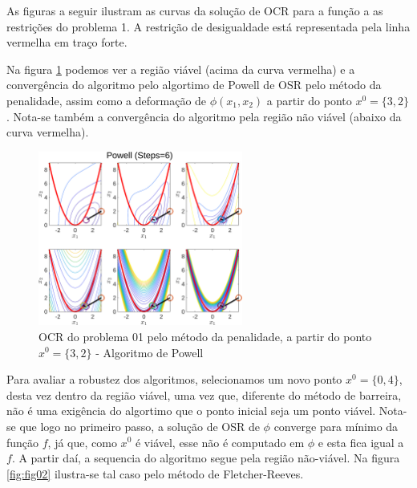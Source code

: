 \documentclass[10pt, a4paper]{article}
\begin{document}

\newpage

As figuras a seguir ilustram as curvas da solu\c c\~ao de OCR para a fun\c c\~ao a as restri\c c\~oes do problema 1. A restri\c c\~ao de desigualdade est\'a representada pela linha vermelha em tra\c co forte.

Na figura \ref{fig:fig01} podemos ver a regi\~ao vi\'avel (acima da curva vermelha) e a converg\^encia do algoritmo pelo algortimo de Powell de OSR pelo m\'etodo da penalidade, assim como a deforma\c c\~ao de $\phi(x_1,x_2)$ a partir do ponto $x^0=\{3,2\}$. Nota-se tamb\'em a converg\^encia do algoritmo pela regi\~ao n\~ao vi\'avel (abaixo da curva vermelha).

\begin{figure}[H]
      \centering
      \includegraphics[width=0.6\textwidth]{fig01_P01_PEN_X1_POW.png}
      \caption{OCR do problema 01 pelo m\'etodo da penalidade, a partir do ponto $x^0=\{3,2\}$ - Algoritmo de Powell}
      \label{fig:fig01}
\end{figure}

Para avaliar a robustez dos algoritmos, selecionamos um novo ponto $x^0=\{0,4\}$, desta vez dentro da regi\~ao vi\'avel, uma vez que, diferente do m\'etodo de barreira, n\~ao \'e uma exig\^encia do algortimo que o ponto inicial seja um ponto vi\'avel. Nota-se que logo no primeiro passo, a solu\c c\~ao de OSR de $\phi$ converge para m\'inimo da fun\c c\~ao $f$, j\'a que, como $x^0$ \'e vi\'avel, esse n\~ao \'e computado em $\phi$ e esta fica igual a $f$. A partir da\'i, a sequencia do algoritmo segue pela regi\~ao n\~ao-vi\'avel. Na figura \ref{fig:fig02} ilustra-se tal caso pelo m\'etodo de Fletcher-Reeves.
\end{document}
